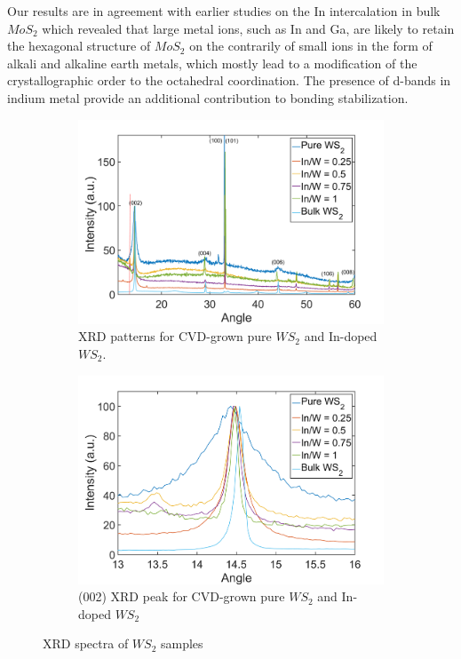 Our results are in agreement with earlier studies on the In intercalation in bulk $MoS_2$ which revealed that large metal ions, such as In and Ga, are likely to retain the hexagonal structure of $MoS_2$ on the contrarily of small ions in the form of alkali and alkaline earth metals, which mostly lead to a modification of the crystallographic order \cite{Somoano1979} to the octahedral coordination. The presence of d-bands in indium metal provide an additional contribution to bonding stabilization.
 

\begin{figure}[!h]
	\begin{center}
		\begin{subfigure}[b]{0.7\textwidth}
			\includegraphics[width=\textwidth]{In/XRDAll.png}
			\caption{XRD patterns for CVD-grown pure $WS_2$ and In-doped $WS_2$.}
			\label{fig:InXRDAll}
		\end{subfigure}
		\qquad
		\begin{subfigure}[b]{0.7\textwidth}
			\includegraphics[width=\textwidth]{In/XRDIn.png}
			\caption{(002) XRD peak for CVD-grown pure $WS_2$ and In-doped $WS_2$}
			\label{fig:InXRDIn}
		\end{subfigure}
		\caption{XRD spectra of $WS_2$ samples}
		\label{fig:InXRDSpectra}
	\end{center}
\end{figure}

